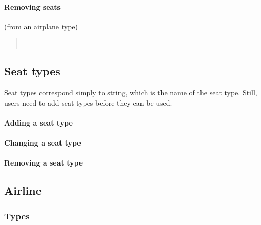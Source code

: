 \paragraph{Removing seats} (from an airplane type)
\begin{quote}
  \\
\end{quote}



\subsection{Seat types}
Seat types correspond simply to string, which is the name of the seat type.
Still, users need to add seat types before they can be used.

\paragraph{Adding a seat type}
\begin{quote}
\end{quote}
\paragraph{Changing a seat type}
\begin{quote}
\end{quote}
\paragraph{Removing a seat type}
\begin{quote}
\end{quote}

\subsection{Airline}
\subsubsection{Types}
\begin{description}
  \item[] 
  \item[] 
\end{description}

